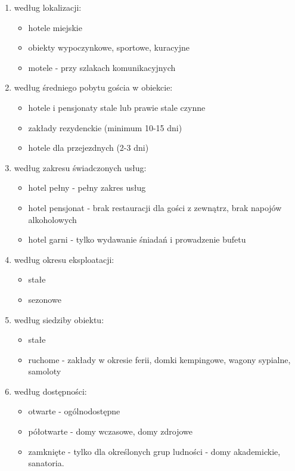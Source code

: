 \documentclass[a4paper,onecolumn,oneside,11pt,wide,floatssmall]{mwrep}
\theoremstyle{definition}
\theoremstyle{plain}%
\theoremstyle{remark}
\begin{document}
\begin{enumerate}
  \item według lokalizacji:
    \begin{itemize}
      \item hotele miejskie
      \item obiekty wypoczynkowe, sportowe, kuracyjne
      \item motele - przy szlakach komunikacyjnych
    \end{itemize}
  \item według średniego pobytu gościa w obiekcie:
    \begin{itemize}
      \item hotele i pensjonaty stale lub prawie stale czynne
      \item zakłady rezydenckie (minimum 10-15 dni)
      \item hotele dla przejezdnych (2-3 dni)
    \end{itemize}
  \item według zakresu świadczonych usług:
    \begin{itemize}
      \item hotel pełny - pełny zakres usług
      \item hotel pensjonat - brak restauracji dla gości z zewnątrz, brak 
      napojów alkoholowych
      \item hotel garni - tylko wydawanie śniadań i prowadzenie bufetu
    \end{itemize}
  \item według okresu eksploatacji:
    \begin{itemize}
      \item stałe
      \item sezonowe
    \end{itemize}
  \item według siedziby obiektu:
    \begin{itemize}
      \item stałe
      \item ruchome - zakłady w okresie ferii, domki kempingowe, wagony 
      sypialne, samoloty
    \end{itemize}
  \item według dostępności:
    \begin{itemize}
      \item otwarte - ogólnodostępne
      \item półotwarte - domy wczasowe, domy zdrojowe
      \item zamknięte - tylko dla określonych grup ludności - domy 
      akademickie, sanatoria.
    \end{itemize}
\end{enumerate}
\end{document}
